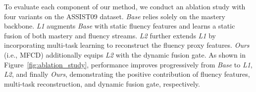 \documentclass[a4paper,runningheads]{llncs}
\def\mymethod{MFCD}
\begin{document}
To evaluate each component of our method, we conduct an ablation study with four variants on the ASSIST09 dataset. \textit{Base} relies solely on the mastery backbone. \textit{L1} augments \textit{Base} with static fluency features and learns a static fusion of both mastery and fluency streams. \textit{L2} further extends \textit{L1} by incorporating multi-task learning to reconstruct the fluency proxy features. \textit{Ours} (i.e., \mymethod) additionally equips \textit{L2} with the dynamic fusion gate. As shown in Figure~\ref{fig:ablation_study}, performance improves progressively from \textit{Base} to \textit{L1}, \textit{L2}, and finally \textit{Ours}, demonstrating the positive contribution of fluency features, multi-task reconstruction, and dynamic fusion gate, respectively.






\end{document}
